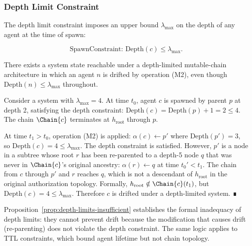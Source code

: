 \subsubsection{Depth Limit Constraint}

The depth limit constraint imposes an upper bound $\lambda_{\text{max}}$ on the depth of any agent at the time of spawn:

\[
\text{SpawnConstraint: } \text{Depth}(c) \leq \lambda_{\text{max}}.
\]

\begin{prop}
\label{prop:depth-limits-insufficient}
There exists a system state reachable under a depth-limited mutable-chain architecture in which an agent $n$ is drifted by operation (M2), even though $\text{Depth}(n) \leq \lambda_{\text{max}}$ throughout.
\end{prop}

\begin{Proof}
Consider a system with $\lambda_{\text{max}} = 4$. At time $t_0$, agent $c$ is spawned by parent $p$ at depth 2, satisfying the depth constraint: $\text{Depth}(c) = \text{Depth}(p) + 1 = 2 \leq 4$. The chain $\Chain{c}$ terminates at $h_{\text{root}}$ through $p$.

At time $t_1 > t_0$, operation (M2) is applied: $\alpha(c) \leftarrow p'$ where $\text{Depth}(p') = 3$, so $\text{Depth}(c) = 4 \leq \lambda_{\text{max}}$. The depth constraint is satisfied. However, $p'$ is a node in a subtree whose root $r$ has been re-parented to a depth-5 node $q$ that was never in $\Chain{c}$'s original ancestry: $\alpha(r) \leftarrow q$ at time $t_0' < t_1$. The chain from $c$ through $p'$ and $r$ reaches $q$, which is not a descendant of $h_{\text{root}}$ in the original authorization topology. Formally, $h_{\text{root}} \notin \Chain{c}(t_1)$, but $\text{Depth}(c) = 4 \leq \lambda_{\text{max}}$. Therefore $c$ is drifted under a depth-limited system. ∎
\end{Proof}

Proposition~\ref{prop:depth-limits-insufficient} establishes the formal inadequacy of depth limits: they cannot prevent drift because the modification that causes drift (re-parenting) does not violate the depth constraint. The same logic applies to TTL constraints, which bound agent lifetime but not chain topology.

